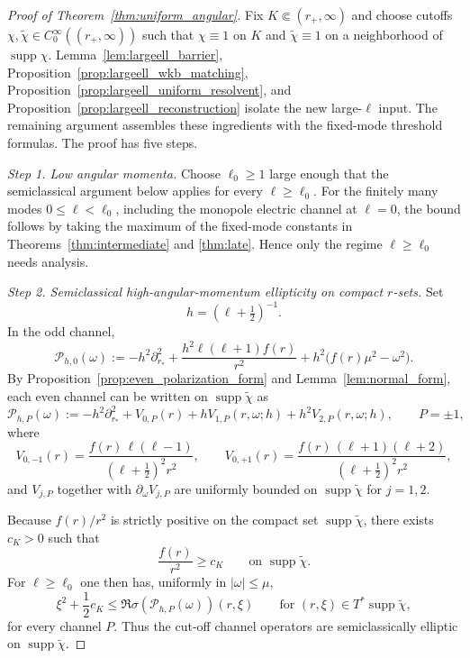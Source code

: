 \documentclass[10pt,a4paper]{amsart}
\newcommand{\abs}[1]{\left|#1\right|}
\newcommand{\om}{\omega}
\begin{document}
\begin{proof}[Proof of Theorem~\ref{thm:uniform_angular}]
Fix $K\Subset(r_+,\infty)$ and choose cutoffs $\chi,\widetilde\chi\in C_0^\infty((r_+,\infty))$ such that $\chi\equiv1$ on $K$ and $\widetilde\chi\equiv1$ on a neighborhood of $\operatorname{supp}\chi$.  Lemma~\ref{lem:largeell_barrier}, Proposition~\ref{prop:largeell_wkb_matching}, Proposition~\ref{prop:largeell_uniform_resolvent}, and Proposition~\ref{prop:largeell_reconstruction} isolate the new large-$\ell$ input.  The remaining argument assembles these ingredients with the fixed-mode threshold formulas.  The proof has five steps.

\smallskip
\noindent\textit{Step 1. Low angular momenta.}
Choose $\ell_0\ge1$ large enough that the semiclassical argument below applies for every $\ell\ge\ell_0$.  For the finitely many modes $0\le\ell<\ell_0$, including the monopole electric channel at $\ell=0$, the bound follows by taking the maximum of the fixed-mode constants in Theorems~\ref{thm:intermediate} and \ref{thm:late}.  Hence only the regime $\ell\ge\ell_0$ needs analysis.

\smallskip
\noindent\textit{Step 2. Semiclassical high-angular-momentum ellipticity on compact $r$-sets.}
Set
\[
   h=(\ell+\tfrac12)^{-1}.
\]
In the odd channel,
\begin{equation}\label{eq:uniform_angular_odd_scaled}
   \mathcal P_{h,0}(\om)
   :=
   -h^2\partial_{r_*}^2
   +\frac{h^2\ell(\ell+1)f(r)}{r^2}
   +h^2\bigl(f(r)\mu^2-\om^2\bigr).
\end{equation}
By Proposition~\ref{prop:even_polarization_form} and Lemma~\ref{lem:normal_form}, each even channel can be written on $\operatorname{supp}\widetilde\chi$ as
\begin{equation}\label{eq:uniform_angular_even_scaled}
   \mathcal P_{h,P}(\om)
   :=
   -h^2\partial_{r_*}^2
   +V_{0,P}(r)
   +hV_{1,P}(r,\om;h)
   +h^2V_{2,P}(r,\om;h),
   \qquad P=\pm1,
\end{equation}
where
\[
   V_{0,-1}(r)=\frac{f(r)\,\ell(\ell-1)}{(\ell+\tfrac12)^2r^2},
   \qquad
   V_{0,+1}(r)=\frac{f(r)\,(\ell+1)(\ell+2)}{(\ell+\tfrac12)^2r^2},
\]
and $V_{j,P}$ together with $\partial_\om V_{j,P}$ are uniformly bounded on $\operatorname{supp}\widetilde\chi$ for $j=1,2$.

Because $f(r)/r^2$ is strictly positive on the compact set $\operatorname{supp}\widetilde\chi$, there exists $c_K>0$ such that
\[
   \frac{f(r)}{r^2}\ge c_K
   \qquad\text{on }\operatorname{supp}\widetilde\chi.
\]
For $\ell\ge\ell_0$ one then has, uniformly in $\abs{\om}\le\mu$,
\begin{equation}\label{eq:uniform_angular_symbol_lb}
   \xi^2+\frac12c_K
   \le
   \Re\sigma(\mathcal P_{h,P}(\om))(r,\xi)
   \qquad
   \text{for }(r,\xi)\in T^*\operatorname{supp}\widetilde\chi,
\end{equation}
for every channel $P$.  Thus the cut-off channel operators are semiclassically elliptic on $\operatorname{supp}\widetilde\chi$.


\end{proof}
\end{document}
